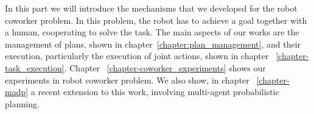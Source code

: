 In this part we will introduce the mechanisms that we developed for the robot coworker problem. In this problem, the robot has to achieve a goal together with a human, cooperating to solve the task. The main aspects of our works are the management of plans, shown in chapter~\ref{chapter:plan_management}, and their execution, particularly the execution of joint actions, shown in chapter ~\ref{chapter-task_execution}. Chapter ~\ref{chapter-coworker_experiments} shows our experiments in robot coworker problem. We also show, in chapter ~\ref{chapter-madp} a recent extension to this work, involving multi-agent probabilistic planning.

 
 
 
 
